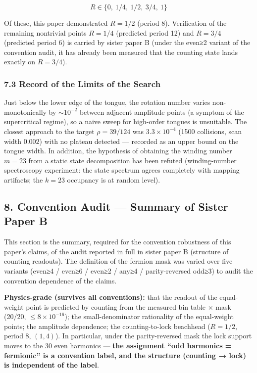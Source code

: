 \documentclass[
  a4paper,
]{article}
\begin{document}
\[
R \in \{0,\ 1/4,\ 1/2,\ 3/4,\ 1\}
\]

Of these, this paper demonstrated \(R=1/2\) (period 8). Verification of
the remaining nontrivial points \(R=1/4\) (predicted period 12) and
\(R=3/4\) (predicted period 6) is carried by sister paper B (under the
even≥2 variant of the convention audit, it has already been measured
that the counting state lands exactly on \(R=3/4\)).

\subsubsection{7.3 Record of the Limits of the
Search}\label{record-of-the-limits-of-the-search}

Just below the lower edge of the tongue, the rotation number varies
non-monotonically by \(\sim10^{-2}\) between adjacent amplitude points
(a symptom of the supercritical regime), so a naive sweep for high-order
tongues is unsuitable. The closest approach to the target
\(\rho=39/124\) was \(3.3\times10^{-4}\) (1500 collisions, scan width
\(0.002\)) with no plateau detected --- recorded as an upper bound on
the tongue width. In addition, the hypothesis of obtaining the winding
number \(m=23\) from a static state decomposition has been refuted
(winding-number spectroscopy experiment: the state spectrum agrees
completely with mapping artifacts; the \(k=23\) occupancy is at random
level).

\subsection{8. Convention Audit --- Summary of Sister Paper
B}\label{convention-audit-summary-of-sister-paper-b}

This section is the summary, required for the convention robustness of
this paper's claims, of the audit reported in full in sister paper B
(structure of counting readouts). The definition of the fermion mask was
varied over five variants (even≥4 / even≥6 / even≥2 / any≥4 /
parity-reversed odd≥3) to audit the convention dependence of the claims.

\textbf{Physics-grade (survives all conventions):} that the readout of
the equal-weight point is predicted by counting from the measured bin
table × mask (20/20, \(\le8\times10^{-16}\)); the small-denominator
rationality of the equal-weight points; the amplitude dependence; the
counting-to-lock beachhead (\(R=1/2\), period 8, \((1,4)\)). In
particular, under the parity-reversed mask the lock support moves to the
30 even harmonics --- \textbf{the assignment ``odd harmonics =
fermionic'' is a convention label, and the structure (counting → lock)
is independent of the label}.
\end{document}
